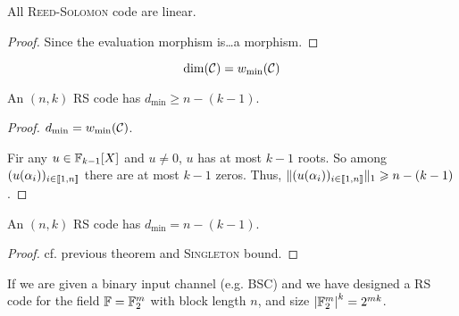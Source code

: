 \begin{proposition}
    All \textsc{Reed-Solomon} code are linear.
\end{proposition}
\begin{proof}
    Since the evaluation morphism is\dots a morphism.
\end{proof}

\begin{corollary}
    \[
        \operatorname{dim}(\mathcal{C}) = w_{\min}(\mathcal{C})
    \]
\end{corollary}

\begin{theorem}
    An $(n,k)$ RS code has $d_{\min} \geqslant n-(k-1)$.
\end{theorem}
\begin{proof}
    $d_{\min} = w_{\min}(\mathcal{C})$.
    
    Fir any $u\in\mathbb{F}_{k-1}[X]$ and $u\neq 0$, $u$ has at most $k-1$ roots. So among $(u(\alpha_i))_{i\in\left\llbracket 1,n \right\rrbracket}$ there are at most $k-1$ zeros. Thus, $\lVert (u(\alpha_i))_{i\in\left\llbracket 1,n \right\rrbracket} \rVert_1 \geqslant n-(k-1)$.
\end{proof}

\begin{corollary}
    An $(n,k)$ RS code has $d_{\min} = n-(k-1)$.
\end{corollary}
\begin{proof}
    cf. previous theorem and \textsc{Singleton} bound.
\end{proof}

If we are given a binary input channel (e.g. BSC) and we have designed a RS code for the field $\mathbb{F} = \mathbb{F}_2^m$ with block length $n$, and size $\left\lvert\mathbb{F}_2^m\right\rvert^k = 2^{mk}$.













